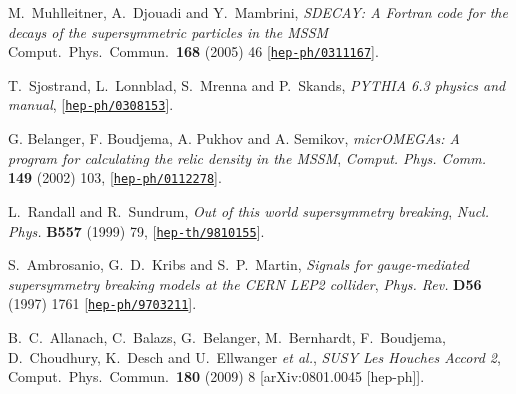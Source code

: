 \documentclass[]{article}
\begin{document}
\begin{thebibliography}{10}
M.~Muhlleitner, A.~Djouadi and Y.~Mambrini,
{\em SDECAY: A Fortran code for the decays of the supersymmetric particles in the
MSSM} 
Comput.\ Phys.\ Commun.\  {\bf 168} (2005) 46
[\href{http://xxx.lanl.gov/abs/hep-ph/0311167}{{\tt hep-ph/0311167}}].

T.~Sjostrand, L.~Lonnblad, S.~Mrenna and P.~Skands,
{\em PYTHIA 6.3 physics and manual}, 
[\href{http://xxx.lanl.gov/abs/hep-ph/0308153}{{\tt hep-ph/0308153}}].

G. Belanger, F. Boudjema, A. Pukhov and A. Semikov,
{\it micrOMEGAs: A program for calculating the relic density in the MSSM},
{\em Comput. Phys. Comm.} {\bf 149} (2002) 103,
  [\href{http://xxx.lanl.gov/abs/hep-ph/0112278}{{\tt hep-ph/0112278}}].

L.~Randall and R.~Sundrum, {\it Out of this world supersymmetry breaking},
  {\em Nucl. Phys.} {\bf B557} (1999) 79,
  [\href{http://xxx.lanl.gov/abs/hep-th/9810155}{{\tt hep-th/9810155}}].

S.~Ambrosanio, G.~D.~Kribs and S.~P.~Martin,
{\it Signals for gauge-mediated supersymmetry breaking models at the CERN
LEP2 collider}, 
{\em Phys. Rev.} {\bf D56} (1997) 1761
  [\href{http://xxx.lanl.gov/abs/hep-ph/9703211}{{\tt hep-ph/9703211}}].

B.~C.~Allanach, C.~Balazs, G.~Belanger, M.~Bernhardt, F.~Boudjema, D.~Choudhury, K.~Desch and U.~Ellwanger {\it et al.},
  {\em SUSY Les Houches Accord 2},
  Comput.\ Phys.\ Commun.\  {\bf 180} (2009) 8
  [arXiv:0801.0045 [hep-ph]].
\end{thebibliography}\endgroup
\end{document}
